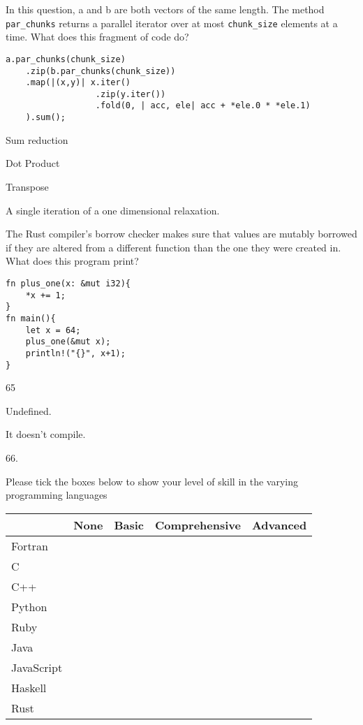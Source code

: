 \documentclass[11pt]{article} %
\newcommand*\choice{\item}
\begin{document}
\begin{multiplechoice}[choices=1]
In this question, a and b are both vectors of the same length. The method \texttt{par\_chunks} returns a parallel iterator over at most \texttt{chunk\_size} elements at a time. What does this fragment of code do?
\begin{lstlisting}
a.par_chunks(chunk_size)
    .zip(b.par_chunks(chunk_size))
    .map(|(x,y)| x.iter()
                  .zip(y.iter())
                  .fold(0, | acc, ele| acc + *ele.0 * *ele.1)
    ).sum();

\end{lstlisting}

\choice Sum reduction
\choice Dot Product
\choice Transpose
\choice A single iteration of a one dimensional relaxation.

\end{multiplechoice}
\begin{multiplechoice}[choices=1]
The Rust compiler's borrow checker makes sure that values are mutably borrowed if they are altered from a different function than the one they were created in. What does this program print?
\begin{lstlisting}
fn plus_one(x: &mut i32){
    *x += 1;
}
fn main(){
    let x = 64;
    plus_one(&mut x);
    println!("{}", x+1);
}
\end{lstlisting}
  \choice 65
  \choice Undefined.
  \choice It doesn't compile.
  \choice 66.
\end{multiplechoice}
\pagebreak
\begin{exercise}
Please tick the boxes below to show your level of skill in the varying programming languages
\begin{center}
\begin{tabular}{|l|c|c|c|c|}
\hline
& None & Basic & Comprehensive & Advanced \\ \hline
Fortran & & & & \\ \hline
C & & & & \\ \hline
C++ & & & & \\ \hline
Python & & & & \\ \hline
Ruby & & & & \\ \hline
Java & & & & \\ \hline
JavaScript & & & & \\ \hline
Haskell & & & & \\ \hline
Rust  & & & & \\ \hline
\end{tabular}
\end{center}

\end{exercise}
\end{document}
